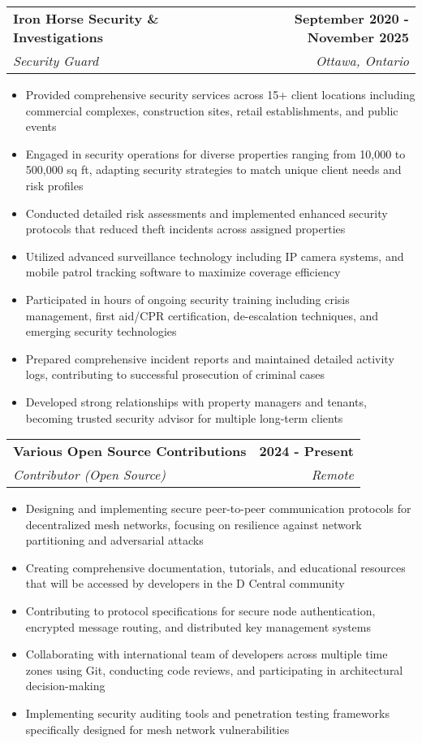 \documentclass[letterpaper,11pt]{article}
\makeatletter
\newcommand{\resumeItem}[1]{
  \item\small{
    {#1 \vspace{-2pt}}
  }
}
\newcommand{\resumeSubheading}[4]{
  \vspace{-2pt}\item
    \begin{tabular*}{1.0\textwidth}[t]{l@{\extracolsep{\fill}}r}
      \textbf{#1} & \textbf{\small #2} \\
      \textit{\small#3} & \textit{\small #4} \\
    \end{tabular*}\vspace{-7pt}
}
\newcommand{\resumeItemListStart}{\begin{itemize}}
\newcommand{\resumeItemListEnd}{\end{itemize}\vspace{-5pt}}
\makeatother
\begin{document}
    \resumeSubheading
      {Iron Horse Security \& Investigations}{September 2020 - November 2025}
      {Security Guard}{Ottawa, Ontario}
      \resumeItemListStart
        \resumeItem{Provided comprehensive security services across 15+ client locations including commercial complexes, construction sites, retail establishments, and public events}
        \resumeItem{Engaged in security operations for diverse properties ranging from 10,000 to 500,000 sq ft, adapting security strategies to match unique client needs and risk profiles}
        \resumeItem{Conducted detailed risk assessments and implemented enhanced security protocols that reduced theft incidents across assigned properties}
        \resumeItem{Utilized advanced surveillance technology including IP camera systems, and mobile patrol tracking software to maximize coverage efficiency}
        \resumeItem{Participated in hours of ongoing security training including crisis management, first aid/CPR certification, de-escalation techniques, and emerging security technologies}
        \resumeItem{Prepared comprehensive incident reports and maintained detailed activity logs, contributing to successful prosecution of criminal cases}
        \resumeItem{Developed strong relationships with property managers and tenants, becoming trusted security advisor for multiple long-term clients}
    \resumeItemListEnd

    \resumeSubheading
      {Various Open Source Contributions}{2024 - Present}
      {Contributor (Open Source)}{Remote}
      \resumeItemListStart
        \resumeItem{Designing and implementing secure peer-to-peer communication protocols for decentralized mesh networks, focusing on resilience against network partitioning and adversarial attacks}
        \resumeItem{Creating comprehensive documentation, tutorials, and educational resources that will be accessed by developers in the D Central community}
        \resumeItem{Contributing to protocol specifications for secure node authentication, encrypted message routing, and distributed key management systems}
        \resumeItem{Collaborating with international team of developers across multiple time zones using Git, conducting code reviews, and participating in architectural decision-making}
        \resumeItem{Implementing security auditing tools and penetration testing frameworks specifically designed for mesh network vulnerabilities}
    \resumeItemListEnd
\end{document}
